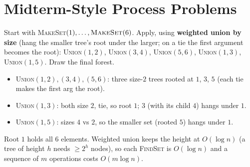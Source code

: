 \documentclass[11pt]{article}
\begin{document}
\section{Midterm-Style Process Problems}

\begin{examplebox}
Start with \textsc{MakeSet}$(1),\dots,\textsc{MakeSet}(6)$. Apply, using \textbf{weighted union by size} (hang the smaller tree's root under the larger; on a tie the first argument becomes the root): \textsc{Union}$(1,2)$, \textsc{Union}$(3,4)$, \textsc{Union}$(5,6)$, \textsc{Union}$(1,3)$, \textsc{Union}$(1,5)$. Draw the final forest.

\begin{answerband}
\begin{itemize}[leftmargin=1.4em,itemsep=1pt]
  \item \textsc{Union}$(1,2),(3,4),(5,6)$: three size-$2$ trees rooted at $1$, $3$, $5$ (each tie makes the first arg the root).
  \item \textsc{Union}$(1,3)$: both size $2$, tie, so root $1$; $3$ (with its child $4$) hangs under $1$.
  \item \textsc{Union}$(1,5)$: sizes $4$ vs $2$, so the smaller set (rooted $5$) hangs under $1$.
\end{itemize}

\begin{center}
\end{center}
Root $1$ holds all $6$ elements. Weighted union keeps the height at $O(\log n)$ (a tree of height $h$ needs $\geq 2^{h}$ nodes), so each \textsc{FindSet} is $O(\log n)$ and a sequence of $m$ operations costs \textcolor{violetT}{$O(m\log n)$}.
\end{answerband}
\end{examplebox}
\end{document}
